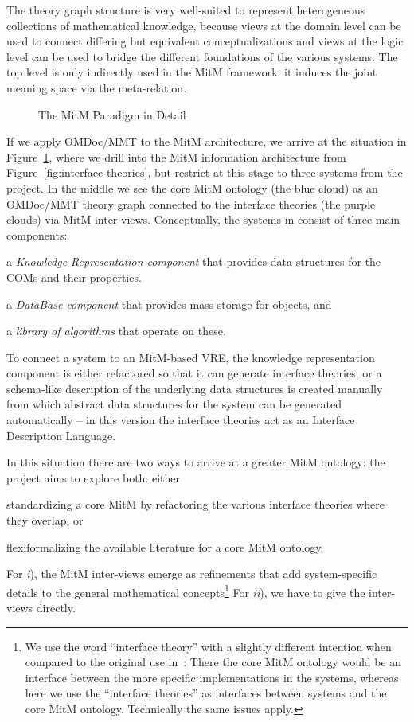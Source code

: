 The theory graph structure is very well-suited to represent heterogeneous collections of
mathematical knowledge, because views at the domain level can be used to connect differing
but equivalent conceptualizations and views at the logic level can be used to bridge the
different foundations of the various systems. The top level is only indirectly used in
the MitM framework: it induces the joint meaning space via the meta-relation.

\begin{figure}[ht]\centering
  
  \caption{The MitM Paradigm in Detail}\label{fig:mitm}
\end{figure}
If we apply OMDoc/MMT to the MitM architecture, we arrive at the situation in
Figure~\ref{fig:mitm}, where we drill into the MitM information architecture from
Figure~\ref{fig:interface-theories}, but restrict at this stage to three systems from the \ODK
project. In the middle we see the core MitM ontology (the blue cloud) as an OMDoc/MMT
theory graph connected to the interface theories (the purple clouds) via MitM
inter-views. Conceptually, the systems in \ODK consist of three main components:
\begin{compactenum}[\em i\rm)]
\item a \emph{Knowledge Representation component} that provides data structures for the
  COMs and their properties.
\item a \emph{DataBase component} that provides mass storage for objects, and 
\item a \emph{library of algorithms} that operate on these.
\end{compactenum}
To connect a system to an MitM-based VRE, the knowledge representation component is either
refactored so that it can generate interface theories, or a schema-like description of the
underlying data structures is created manually from which abstract data structures for the
system can be generated automatically -- in this version the interface theories act as an
Interface Description Language.

In this situation there are two ways to arrive at a greater MitM ontology: the \ODK
project aims to explore both: either
\begin{inparaenum}[\em i\rm)] 
\item standardizing a core MitM by refactoring the various interface theories where they
  overlap, or
\item flexiformalizing the available literature for a core MitM ontology.
\end{inparaenum}
For \emph{i}), the MitM inter-views emerge as refinements that add system-specific details
to the general mathematical concepts\footnote{We use the word ``interface theory'' with a
  slightly different intention when compared to the original use
  in~\cite{KohRabSac:fvip11}: There the core MitM ontology would be an interface between
  the more specific implementations in the systems, whereas here we use the ``interface
  theories'' as interfaces between systems and the core MitM ontology. Technically the
  same issues apply.} For \emph{ii}), we have to give the inter-views directly. 

